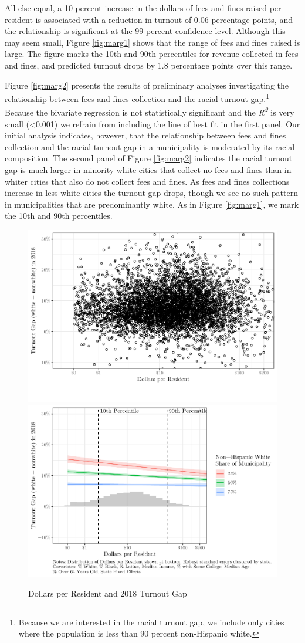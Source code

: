 \documentclass[
  12pt,
]{article}
\begin{document}
All else equal, a 10 percent increase in the dollars of fees and fines raised per resident is associated with a reduction in turnout of 0.06 percentage points, and the relationship is significant at the 99 percent confidence level. Although this may seem small, Figure \ref{fig:marg1} shows that the range of fees and fines raised is large. The figure marks the 10th and 90th percentiles for revenue collected in fees and fines, and predicted turnout drops by 1.8 percentage points over this range.

Figure \ref{fig:marg2} presents the results of preliminary analyses investigating the relationship between fees and fines collection and the racial turnout gap.\footnote{Because we are interested in the racial turnout gap, we include only cities where the population is less than 90 percent non-Hispanic white.} Because the bivariate regression is not statistically significant and the \emph{R\textsuperscript{2}} is very small (\textless0.001) we refrain from including the line of best fit in the first panel. Our initial analysis indicates, however, that the relationship between fees and fines collection and the racial turnout gap in a municipality is moderated by its racial composition. The second panel of Figure \ref{fig:marg2} indicates the racial turnout gap is much larger in minority-white cities that collect no fees and fines than in whiter cities that also do not collect fees and fines. As fees and fines collections increase in less-white cities the turnout gap drops, though we see no such pattern in municipalities that are predominantly white. As in Figure \ref{fig:marg1}, we mark the 10th and 90th percentiles.

\begin{figure}[H]
\includegraphics[width=0.5\linewidth]{fees_fines_to_files/figure-latex/unnamed-chunk-1-1} \includegraphics[width=0.5\linewidth]{fees_fines_to_files/figure-latex/unnamed-chunk-1-2} \caption{\label{fig:marg2}Dollars per Resident and 2018 Turnout Gap}\label{fig:unnamed-chunk-1}
\end{figure}
\end{document}
